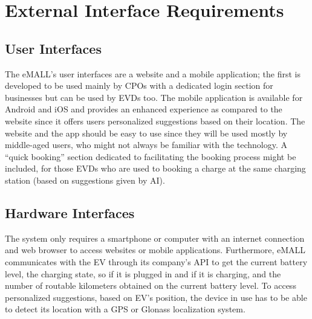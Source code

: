 \section{External Interface Requirements}
\label{sec:external_interface_requirements}%

\subsection{User Interfaces}
\label{subsec:user_interfaces}%
The eMALL’s user interfaces are a website and a mobile application;
the first is developed to be used mainly by CPOs with a dedicated login section for businesses but can be used by EVDs too.
The mobile application is available for Android and iOS and provides an enhanced experience as compared to the website
since it offers users personalized suggestions based on their location.
The website and the app should be easy to use since they will be used mostly by middle-aged users,
who might not always be familiar with the technology.
A “quick booking” section dedicated to facilitating the booking process might be included,
for those EVDs who are used to booking a charge at the same charging station (based on suggestions given by AI).

\subsection{Hardware Interfaces}
\label{subsec:hardware_interfaces}%
The system only requires a smartphone or computer with an internet connection and web browser to access websites or mobile applications.
Furthermore, eMALL communicates with the EV through its company's API to get the current battery level, the charging state,
so if it is plugged in and if it is charging, and the number of routable kilometers obtained on the current battery level.
To access personalized suggestions, based on EV’s position, the device in use has to be able to detect its location with a GPS or Glonass localization system.

